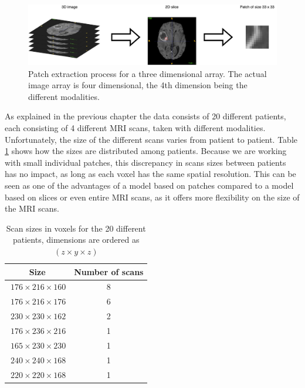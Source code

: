 \documentclass[12pt,a4paper,twoside,openright]{report}
\begin{document}
\begin{figure}[h]
	\centering
	\includegraphics[width=\textwidth]{patch_extraction}
	\caption[Patch extraction process for a three dimensional array.]{Patch extraction process for a three dimensional array. The actual image array is four dimensional, the 4th dimension being the different modalities.}
	\label{fig:patch_extraction}
\end{figure}

 
As explained in the previous chapter the data consists of 20 different patients, each consisting of 4 different MRI scans, taken with different modalities. Unfortunately, the size of the different scans varies from patient to patient. Table \ref{table:scan_sizes} shows how the sizes are distributed among patients. Because we are working with small individual patches, this discrepancy in scans sizes between patients has no impact, as long as each voxel has the same spatial resolution. This can be seen as one of the advantages of a model based on patches compared to a model based on slices or even entire MRI scans, as it offers more flexibility on the size of the MRI scans.

\begin{table}[h]
\centering	
\label{table:scan_sizes}
\begin{tabular}{ c c } 
\textbf{Size} & \textbf{Number of scans}\\
 \hline
 $\ 176 \times 216 \times 160$ & 8 \\ 
 $\ 176 \times 216 \times 176$ & 6 \\ 
 $\ 230 \times 230 \times 162$ & 2 \\ 
 $\ 176 \times 236 \times 216$ & 1 \\ 
 $\ 165 \times 230 \times 230$ & 1 \\ 
 $\ 240 \times 240 \times 168$ & 1 \\ 
 $\ 220 \times 220 \times 168$ & 1 \\ 

\end{tabular}
\caption{Scan sizes in voxels for the 20 different patients, dimensions are ordered as $(z \times y \times z)$}
\end{table}
\end{document}
